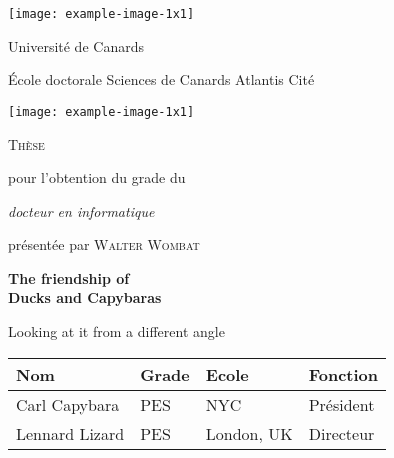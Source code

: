 \documentclass{article}
\begin{document}
\begin{titlepage}
	\centering
		\texttt{[image: example-image-1x1]}
		\hfill
		\parbox{.4\linewidth}{%
			\centering
			{\LARGE Universit\'e de Canards\par}
			\vspace{.05\textheight}
			{\large\'Ecole doctorale Sciences de Canards Atlantis Cit\'e\par}
		}
		\hfill
		\texttt{[image: example-image-1x1]}
		\par
		\vspace{.05\textheight}
		{\LARGE\scshape Th\`ese\par}
		\vspace{.05\textheight}
		pour l'obtention du grade du \par
		{\itshape\large docteur en informatique\par}
		\vspace{.05\textheight}
		pr\'esent\'ee par \textsc{Walter Wombat}\par
		\vspace{.05\textheight}
		{\Huge\bfseries The friendship of \\ 
			Ducks and Capybaras\par}
		\vspace{.05\textheight}
		{\large Looking at it from a different angle\par}
		\vfill
		\noindent\begin{tabularx}{\textwidth}{XXXX}
			\toprule
			Nom            & Grade & Ecole      & Fonction \\
			\midrule
			Carl Capybara  & PES   & NYC        & Pr\'esident \\
			Lennard Lizard & PES   & London, UK & Directeur \\
			\bottomrule
		\end{tabularx}
\end{titlepage}
\end{document}
